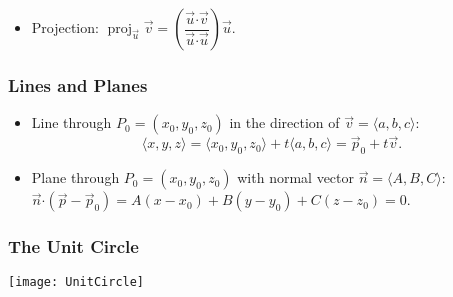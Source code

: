 \documentclass[letterpaper,8pt,landscape]{article}
\newcommand{\dotp}{\boldsymbol{\cdot}}
\begin{document}
\begin{multicols}{2}
\begin{itemize}
 \item Projection: $\operatorname{proj}_{\vec{u}}\vec{v} = \left(\dfrac{\vec{u}\dotp\vec{v}}{\vec{u}\dotp\vec{u}}\right)\vec{u}$.
\end{itemize}
\subsubsection*{Lines and Planes}
\begin{itemize}
 \item Line through $P_0 = (x_0,y_0,z_0)$ in the direction of $\vec{v} = \langle a,b,c\rangle$:
\[
 \langle x,y,z\rangle = \langle x_0,y_0,z_0\rangle + t\langle a,b,c\rangle = \vec{p}_0+t\vec{v}.
\]
 \item Plane through $P_0 = (x_0,y_0,z_0)$ with normal vector $\vec{n} = \langle A,B,C\rangle$: $\vec{n}\dotp (\vec{p}-\vec{p}_0) = A(x-x_0)+B(y-y_0)+C(z-z_0) = 0$.
\end{itemize}
\subsubsection*{The Unit Circle}
\begin{center}
 \texttt{[image: UnitCircle]}
\end{center}

\end{multicols}
\end{document}
